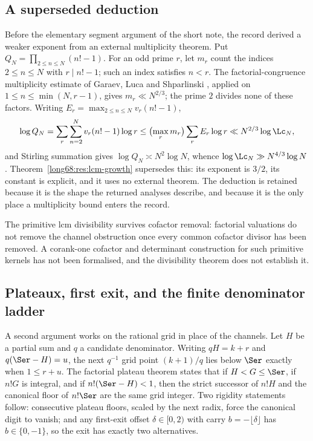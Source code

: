 \subsection{A superseded deduction}\label{long68:sec:ext-superseded}

Before the elementary segment argument of the short note, the record derived
a weaker exponent from an external multiplicity theorem.  Put
$Q_N=\prod_{2\le n\le N}(n!-1)$.  For an odd prime $r$, let $m_r$ count the
indices $2\le n\le N$ with $r\mid n!-1$; such an index satisfies $n<r$.  The
factorial-congruence multiplicity estimate of Garaev, Luca and Shparlinski
\cite[arXiv v1, Thm.~12, p.~16]{garaev-luca-shparlinski}, applied on
$1\le n\le\min(N,r-1)$, gives $m_r\ll N^{2/3}$; the prime $2$ divides none of
these factors.  Writing $E_r=\max_{2\le n\le N}v_r(n!-1)$,
\[
 \log Q_N=\sum_r\sum_{n=2}^{N}v_r(n!-1)\log r
 \le\bigl(\max_r m_r\bigr)\sum_rE_r\log r
 \ll N^{2/3}\log \Lc_N ,
\]
and Stirling summation gives $\log Q_N\asymp N^2\log N$, whence
$\log \Lc_N\gg N^{4/3}\log N$.  Theorem~\ref{long68:res:lcm-growth} supersedes this:
its exponent is $3/2$, its constant is explicit, and it uses no external
theorem.  The deduction is retained because it is the shape the returned
analyses describe, and because it is the only place a multiplicity bound
enters the record.

The primitive lcm divisibility survives cofactor removal: factorial
valuations do not remove the channel obstruction once every common cofactor
divisor has been removed.  A corank-one cofactor and determinant construction
for such primitive kernels has not been formalised, and the divisibility
theorem does not establish it.

\subsection{Plateaux, first exit, and the finite denominator ladder}
\label{long68:sec:ext-plateau}

A second argument works on the rational grid in place of the channels.  Let
$H$ be a partial sum and $q$ a candidate denominator.  Writing $qH=k+r$ and
$q(\Ser-H)=u$, the next $q^{-1}$ grid point $(k+1)/q$ lies below $\Ser$
exactly when $1\le r+u$.  The factorial plateau theorem states that if
$H<G\le\Ser$, if $n!G$ is integral, and if $n!(\Ser-H)<1$, then the strict
successor of $n!H$ and the canonical floor of $n!\Ser$ are the same grid
integer.  Two rigidity statements follow: consecutive plateau floors, scaled
by the next radix, force the canonical digit to vanish; and any first-exit
offset $\delta\in[0,2)$ with carry $b=-\lfloor\delta\rfloor$ has
$b\in\{0,-1\}$, so the exit has exactly two alternatives.

